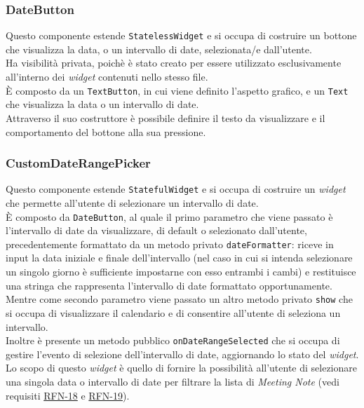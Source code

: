\subsubsection*{DateButton}
\label{subsubsec:date-button}

Questo componente estende \lstinline{StatelessWidget} e si occupa di costruire un bottone che visualizza la data, o un intervallo di date, selezionata/e dall'utente.\\
Ha visibilità privata, poichè è stato creato per essere utilizzato esclusivamente all'interno dei \emph{widget} contenuti nello stesso file.\\
È composto da un \lstinline{TextButton}\cite{site:text-button}, in cui viene definito l'aspetto grafico, e un \lstinline{Text} che visualizza la data o un intervallo di date. \\
Attraverso il suo costruttore è possibile definire il testo da visualizzare e il comportamento del bottone alla sua pressione.\\

\subsubsection*{CustomDateRangePicker}
\label{subsubsec:custom-date-range-picker}

Questo componente estende \lstinline{StatefulWidget} e si occupa di costruire un \emph{widget} che permette all'utente di selezionare un intervallo di date.\\
È composto da \lstinline{DateButton}, al quale il primo parametro che viene passato è l'intervallo di date da visualizzare, di default o selezionato dall'utente, precedentemente formattato da un metodo privato \lstinline{dateFormatter}: riceve in input la data iniziale e finale dell'intervallo (nel caso in cui si intenda selezionare un singolo giorno è sufficiente impostarne con esso entrambi i cambi) e restituisce una stringa che rappresenta l'intervallo di date formattato opportunamente.\\
Mentre come secondo parametro viene passato un altro metodo privato \lstinline{show} che si occupa di visualizzare il calendario e di consentire all'utente di seleziona un intervallo. \\
Inoltre è presente un metodo pubblico \lstinline{onDateRangeSelected} che si occupa di gestire l'evento di selezione dell'intervallo di date, aggiornando lo stato del \emph{widget}. \\
Lo scopo di questo \emph{widget} è quello di fornire la possibilità all'utente di selezionare una singola data o intervallo di date per filtrare la lista di \emph{Meeting Note} (vedi requisiti \hyperref[RFN-18]{RFN-18} e \hyperref[RFN-19]{RFN-19}).

